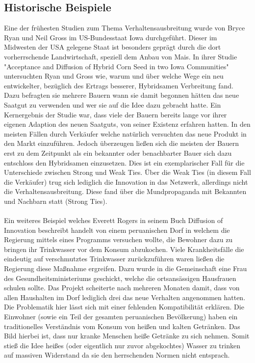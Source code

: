 \documentclass[12pt]{article}
\begin{document}
\subsection{Historische Beispiele}
\label{ss_history}
Eine der frühesten Studien zum Thema Verhaltensausbreitung wurde von Bryce Ryan und Neil Gross im US-Bundesstaat Iowa durchgeführt. Dieser im Midwesten der USA gelegene Staat ist besonders geprägt durch die dort vorherrschende Landwirtschaft, speziell dem Anbau von Mais. In ihrer Studie "Acceptance and Diffusion of Hybrid Corn Seed in two Iowa Communities" \cite{Ryan43} untersuchten Ryan und Gross wie, warum und über welche Wege ein neu entwickelter, bezüglich des Ertrags besserer, Hybridsamen Verbreitung fand. Dazu befragten sie mehrere Bauern wann sie damit begonnen hätten das neue Saatgut zu verwenden und wer sie auf die Idee dazu gebracht hatte. Ein Kernergebnis der Studie war, dass viele der Bauern bereits lange vor ihrer eigenen Adaption des neuen Saatguts, von seiner Existenz erfahren hatten. In den meisten Fällen durch Verkäufer welche natürlich versuchten das neue Produkt in den Markt einzuführen. Jedoch überzeugen ließen sich die meisten der Bauern erst zu dem Zeitpunkt als ein bekannter oder benachbarter Bauer sich dazu entschloss den Hybridsamen einzusetzen. Dies ist ein exemplarischer Fall für die Unterschiede zwischen Strong und Weak Ties. Über die Weak Ties (in diesem Fall die Verkäufer) trug sich lediglich die Innovation in das Netzwerk, allerdings nicht die Verhaltensausbreitung. Diese fand über die Mundpropaganda mit Bekannten und Nachbarn statt (Strong Ties). \\\\
Ein weiteres Beispiel welches Everett Rogers in seinem Buch Diffusion of Innovation beschreibt handelt von einem peruanischen Dorf in welchem die Regierung mittels eines Programms versuchen wollte, die Bewohner dazu zu bringen ihr Trinkwasser vor dem Konsum abzukochen. Viele Krankheitsfälle die eindeutig auf verschmutztes Trinkwasser zurückzuführen waren ließen die Regierung diese Maßnahme ergreifen. Dazu wurde in die Gemeinschaft eine Frau des Gesundheitsministeriums geschickt, welche die ortsansässigen Hausfrauen schulen sollte. Das Projekt scheiterte nach mehreren Monaten damit, dass von allen Haushalten im Dorf lediglich drei das neue Verhalten angenommen hatten. Die Problematik hier lässt sich mit einer fehlenden Kompatibilität erklären. Die Einwohner (sowie ein Teil der gesamten peruanischen Bevölkerung) haben ein traditionelles Verständnis vom Konsum von heißen und kalten Getränken. Das Bild hierbei ist, dass nur kranke Menschen heiße Getränke zu sich nehmen. Somit stieß die Idee heißes (oder eigentlich nur zuvor abgekochtes) Wasser zu trinken auf massiven Widerstand da sie den herrschenden Normen nicht entsprach. \\\\
\end{document}
